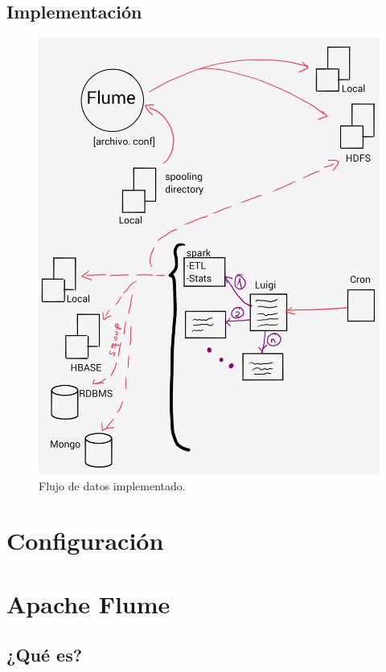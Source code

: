 \documentclass[]{article}
\begin{document}
\subsection{Implementación}\label{implementacion}

\begin{figure}[H]
\centering
\includegraphics[width=0.8 \textwidth]{img/arquitectura.jpg}
\caption{Flujo de datos implementado.}
\end{figure}

\section{Configuración}\label{configuracion}

\section{Apache Flume}\label{apache-flume}

\subsection{¿Qué es?}\label{que-es}
\end{document}
